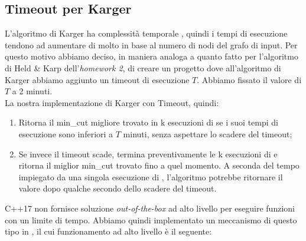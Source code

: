 \subsection{Timeout per Karger}

\noindent L'algoritmo di Karger ha complessità temporale
\complexityKargerTime{}, quindi i tempi di esecuzione tendono ad
aumentare di molto in base al numero di nodi del grafo di input. Per
questo motivo abbiamo deciso, in maniera analoga a quanto fatto per
l'algoritmo di Held \& Karp dell'\emph{homework 2}, di creare un progetto
dove all'algoritmo di Karger abbiamo aggiunto un timeout di esecuzione
$T$. Abbiamo fissato il valore di $T$ a 2 minuti.\\

\noindent La nostra implementazione di Karger con Timeout, quindi:

\begin{enumerate}
    \item Ritorna il min\_cut migliore trovato in k esecuzioni di
       se i suoi tempi di esecuzione
      sono inferiori a $T$ minuti, senza aspettare lo scadere del
      timeout;
    \item Se invece il timeout scade, termina preventivamente le k
      esecuzioni di  e ritorna il
      miglior min\_cut trovato fino a quel momento. A seconda del
      tempo impiegato da una singola esecuzione di
      , l'algoritmo potrebbe ritornare
      il valore dopo qualche secondo dello scadere del timeout.
\end{enumerate}

\noindent C++17 non fornisce soluzione \textit{out-of-the-box} ad alto
livello per eseguire funzioni con un limite di tempo. Abbiamo quindi
implementato un meccanismo di questo tipo in
, il cui funzionamento ad alto livello è
il seguente:

